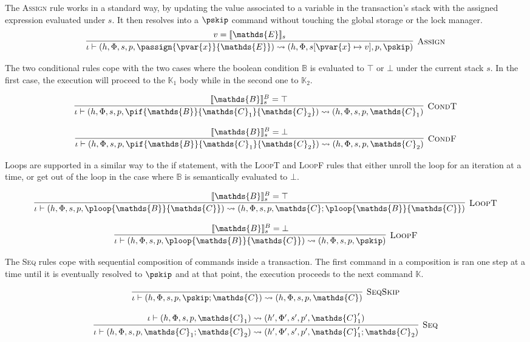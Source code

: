 The \textsc{Assign} rule works in a standard way, by updating the value associated to a variable in the transaction's stack with the assigned expression evaluated under $s$. It then resolves into a $\pskip$ command without touching the global storage or the lock manager.
\[
\infer[\textsc{Assign}]
{
	\iota \vdash (h, \Phi, s, p, \passign{\pvar{x}}{\mathds{E}})
	\rightsquigarrow
	(h, \Phi, s[\pvar{x} \mapsto v], p, \pskip)
}
{
	v = \llbracket \mathds{E} \rrbracket_s
}
\]

The two conditional rules cope with the two cases where the boolean condition $\mathds{B}$ is evaluated to $\top$ or $\bot$ under the current stack $s$. In the first case, the execution will proceed to the $\mathds{K}_1$ body while in the second one to $\mathds{K}_2$.

\[
\infer[\textsc{CondT}]
{
	\iota \vdash (h, \Phi, s, p, \pif{\mathds{B}}{\mathds{C}_1}{\mathds{C}_2})
	\rightsquigarrow
	(h, \Phi, s, p, \mathds{C}_1)
}
{
	\llbracket \mathds{B} \rrbracket_s^B = \top
}
\]

\[
\infer[\textsc{CondF}]
{
	\iota \vdash (h, \Phi, s, p, \pif{\mathds{B}}{\mathds{C}_1}{\mathds{C}_2})
	\rightsquigarrow
	(h, \Phi, s, p, \mathds{C}_2)
}
{
	\llbracket \mathds{B} \rrbracket_s^B = \bot
}
\]

Loops are supported in a similar way to the if statement, with the \textsc{LoopT} and \textsc{LoopF} rules that either unroll the loop for an iteration at a time, or get out of the loop in the case where $\mathds{B}$ is semantically evaluated to $\bot$.

\[
\infer[\textsc{LoopT}]
{
	\iota \vdash (h, \Phi, s, p, \ploop{\mathds{B}}{\mathds{C}})
	\rightsquigarrow
	(h, \Phi, s, p, \mathds{C}; \ploop{\mathds{B}}{\mathds{C}})
}
{
	\llbracket \mathds{B} \rrbracket_s^B = \top
}
\]

\[
\infer[\textsc{LoopF}]
{
	\iota \vdash (h, \Phi, s, p, \ploop{\mathds{B}}{\mathds{C}})
	\rightsquigarrow
	(h, \Phi, s, p, \pskip)
}
{
	\llbracket \mathds{B} \rrbracket_s^B = \bot
}
\]

The \textsc{Seq} rules cope with sequential composition of commands inside a transaction. The first command in a composition is ran one step at a time until it is eventually resolved to $\pskip$ and at that point, the execution proceeds to the next command $\mathds{K}$.

\[
\infer[\textsc{SeqSkip}]
{
	\iota \vdash (h, \Phi, s, p, \pskip ; \mathds{C})
	\rightsquigarrow
	(h, \Phi, s, p, \mathds{C})
}
{}
\]

\[
\infer[\textsc{Seq}]
{
	\iota \vdash (h, \Phi, s, p, \mathds{C}_1 ; \mathds{C}_2)
	\rightsquigarrow
	(h', \Phi', s', p', \mathds{C}_1' ; \mathds{C}_2)
}
{
	\iota \vdash (h, \Phi, s, p, \mathds{C}_1)
	\rightsquigarrow
	(h', \Phi', s', p', \mathds{C}_1')
}
\]

